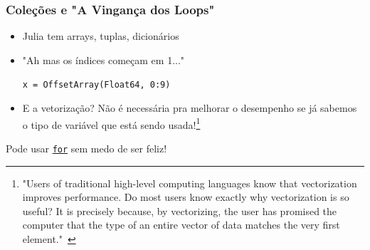 \documentclass{beamer}
\begin{document}
\begin{frame}
	\frametitle{Coleções e "A Vingança dos Loops"}
    \begin{itemize}
    \item Julia tem arrays, tuplas, dicionários
    \item "Ah mas os índices começam em 1..."\\ 
    	\begin{center}
	    	\texttt{x = OffsetArray(Float64,  0:9)}
        \end{center}
    \item E a vetorização? Não é necessária pra melhorar o desempenho se já sabemos o tipo de variável que está sendo usada!\footnote{"Users  of  traditional high-level computing languages know that vectorization improves performance. Do most users know exactly why vectorization is so useful?  It is precisely because, by vectorizing, the user has promised the computer that the type of an entire vector of data matches the very first element."\ \cite{juliapaper}}
    \end{itemize}
        
    \begin{center}
    	Pode usar \underline{\texttt{for}} sem medo de ser feliz!
    \end{center}

\end{frame}
\end{document}
